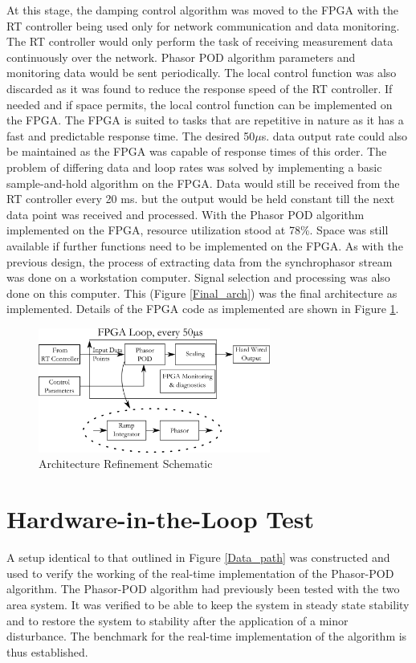 \documentclass[conference]{IEEEtran}
\begin{document}
At this stage, the damping control algorithm was moved to the FPGA with the RT controller being used only for network communication and data monitoring. The RT controller would only perform the task of receiving measurement data continuously over the network. Phasor POD algorithm parameters and monitoring data would be sent periodically. The local control function was also discarded as it was found to reduce the response speed of the RT controller. If needed and if space permits, the local control function can be implemented on the FPGA. The FPGA is suited to tasks that are repetitive in nature as it has a fast and predictable response time. The desired 50$\mu$s. data output rate could also be maintained as the FPGA was capable of response times of this order. The problem of differing data and loop rates was solved by implementing a basic sample-and-hold algorithm on the FPGA. Data would still be received from the RT controller every 20 ms. but the output would be held constant till the next data point was received and processed. With the Phasor POD algorithm implemented on the FPGA, resource utilization stood at 78\%. Space was still available if further functions need to be implemented on the FPGA. As with the previous design, the process of extracting data from the synchrophasor stream was done on a workstation computer. Signal selection and processing was also done on this computer. This (Figure \ref{Final_arch}) was the final architecture as implemented. Details of the FPGA code as implemented are shown in Figure \ref{FPGA_Blocks}.\\

\begin{figure}[!t]
\centering
\includegraphics[width=3in]{FPGAOnly.png} 
\caption{Architecture Refinement Schematic}
\label{FPGA_Blocks}
\end{figure}


\section{Hardware-in-the-Loop Test} \label{HILtest}

A setup identical to that outlined in Figure \ref{Data_path} was constructed and used to verify the working of the real-time implementation of the Phasor-POD algorithm. The Phasor-POD algorithm had previously been tested with the two area system. It was verified to be able to keep the system in steady state stability and to restore the system to stability after the application of a minor disturbance. The benchmark for the real-time implementation of the algorithm is thus established.\\
\end{document}
